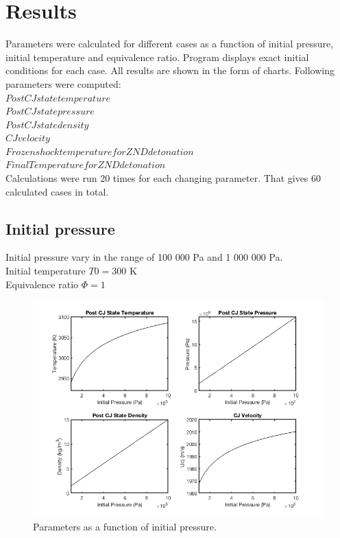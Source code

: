 \documentclass[a4paper]{article}
\newcommand{\sepspace}{\vspace*{1em}}
\begin{document}
\sepspace

\section{Results}

Parameters were calculated for different cases as  a function of initial pressure, initial temperature and equivalence ratio. Program displays exact initial conditions for each case.  All results are shown in the form of charts. Following parameters were computed: \\
\bullet $ Post CJ state temperature$\\
\bullet $ Post CJ state pressure$\\
\bullet $ Post CJ state density$\\
\bullet $ CJ velocity$\\
\bullet $ Frozen shock temperature for ZND detonation$\\
\bullet $ Final Temperature for ZND detonation$\\

\noindent
Calculations were run 20 times for each changing parameter. That gives 60 calculated cases in total.

\pagebreak


\subsection{Initial pressure}
\sepspace

Initial pressure vary in the range of 100 000 Pa and 1 000 000 Pa.\\
Initial temperature $T0 = 300$ K\\
Equivalence ratio $\Phi = 1$

\begin{figure}[h!]
\centering
\includegraphics[width=1\textwidth]{P.png}
\caption{\label{fig:1}Parameters as a function of initial pressure.}
\end{figure}
\end{document}

